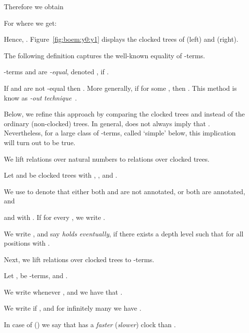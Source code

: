 Therefore we obtain 



For  where  we get:

Hence, .
Figure~\ref{fig:boem:y0:y1} displays the 
clocked \bohm{} trees of  (left) and  (right).

The following definition captures the well-known \boehm{} equality
of -terms.
\begin{definition}
  -terms  and  are \emph{-equal},
  denoted ,
  if .
\end{definition}

If  and  are not -equal then .
More generally, if for some , 
 then .
This method is know as \emph{\bohm-out technique}~\cite{bare:1984}.

Below, we refine this approach by comparing
the clocked \bohm{} trees  and 
instead of the ordinary (non-clocked) \boehm{} trees.
In general, 
does not always imply that .
Nevertheless, for a large class of -terms, called `simple' below,
this implication will turn out to be true.


We lift relations over natural numbers to relations over clocked \boehm{} trees.

\newcommand{\scbt}{T}
\newcommand{\cbt}{\sub{\scbt}}
\newcommand{\acbt}{\cbt{1}}
\newcommand{\bcbt}{\cbt{2}}

\begin{definition}
  Let  and  be clocked \boehm{} trees
  with ,
  ,
  and .

  We use  to denote that either
  both  and  are not annotated,
  or 
  both are annotated, and
  
  and 
  with .
  If  for every , 
  we write .



  We write , and say \emph{ holds eventually},
  if there exists a depth level 
  such that   for all positions  with .
\end{definition}

Next, we lift relations over clocked \bohm{} trees to -terms.
\begin{definition}
  Let ,  be -terms, and .

  We write  whenever ,
  and we have that .
  
  We write  if ,
  and for infinitely many  we have
  .
\end{definition}



In case of  () we say that 
 has a \emph{faster} (\emph{slower}) clock than .


